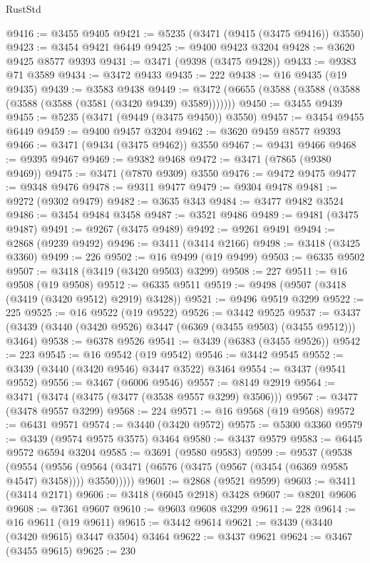 \begin{lexlean}{RustStd}
\begin{coremodule}
{{{{{{{{{{{{{{{{{{{@9416 := @3455 @9405
@9421 := @5235 (@3471 (@9415 (@3475 @9416)) @3550)
@9423 := @3454 @9421 @6449
@9425 := @9400 @9423 @3204
@9428 := @3620 @9425 @8577 @9393
@9431 := @3471 (@9398 (@3475 @9428))
@9433 := @9383 @71 @3589
@9434 := @3472 @9433
@9435 := 222
@9438 := @16 @9435 (@19 @9435)
@9439 := @3583 @9438
@9449 := @3472 (@6655 (@3588 (@3588 (@3588 (@3588 (@3588 (@3581 (@3420 @9439) @3589)))))))
@9450 := @3455 @9439
@9455 := @5235 (@3471 (@9449 (@3475 @9450)) @3550)
@9457 := @3454 @9455 @6449
@9459 := @9400 @9457 @3204
@9462 := @3620 @9459 @8577 @9393
@9466 := @3471 (@9434 (@3475 @9462)) @3550
@9467 := @9431 @9466
@9468 := @9395 @9467
@9469 := @9382 @9468
@9472 := @3471 (@7865 (@9380 @9469))
@9475 := @3471 (@7870 @9309) @3550
@9476 := @9472 @9475
@9477 := @9348 @9476
@9478 := @9311 @9477
@9479 := @9304 @9478
@9481 := @9272 (@9302 @9479)
@9482 := @3635 @343
@9484 := @3477 @9482 @3524
@9486 := @3454 @9484 @3458
@9487 := @3521 @9486
@9489 := @9481 (@3475 @9487)
@9491 := @9267 (@3475 @9489)
@9492 := @9261 @9491
@9494 := @2868 (@9239 @9492)
@9496 := @3411 (@3414 @2166)
@9498 := @3418 (@3425 @3360)
@9499 := 226
@9502 := @16 @9499 (@19 @9499)
@9503 := @6335 @9502
@9507 := @3418 (@3419 (@3420 @9503) @3299)
@9508 := 227
@9511 := @16 @9508 (@19 @9508)
@9512 := @6335 @9511
@9519 := @9498 (@9507 (@3418 (@3419 (@3420 @9512) @2919) @3428))
@9521 := @9496 @9519 @3299
@9522 := 225
@9525 := @16 @9522 (@19 @9522)
@9526 := @3442 @9525
@9537 := @3437 (@3439 (@3440 (@3420 @9526) @3447 (@6369 (@3455 @9503) (@3455 @9512))) @3464)
@9538 := @6378 @9526
@9541 := @3439 (@6383 (@3455 @9526))
@9542 := 223
@9545 := @16 @9542 (@19 @9542)
@9546 := @3442 @9545
@9552 := @3439 (@3440 (@3420 @9546) @3447 @3522) @3464
@9554 := @3437 (@9541 @9552)
@9556 := @3467 (@6006 @9546)
@9557 := @8149 @2919
@9564 := @3471 (@3474 (@3475 (@3477 (@3538 @9557 @3299) @3506)))
@9567 := @3477 (@3478 @9557 @3299)
@9568 := 224
@9571 := @16 @9568 (@19 @9568)
@9572 := @6431 @9571
@9574 := @3440 (@3420 @9572)
@9575 := @5300 @3360
@9579 := @3439 (@9574 @9575 @3575) @3464
@9580 := @3437 @9579
@9583 := @6445 @9572 @6594 @3204
@9585 := @3691 (@9580 @9583)
@9599 := @9537
    (@9538
      (@9554
        (@9556 (@9564 (@3471 (@6576 (@3475 (@9567 (@3454 (@6369 @9585 @4547) @3458)))) @3550)))))
@9601 := @2868 (@9521 @9599)
@9603 := @3411 (@3414 @2171)
@9606 := @3418 (@6045 @2918) @3428
@9607 := @8201 @9606
@9608 := @7361 @9607
@9610 := @9603 @9608 @3299
@9611 := 228
@9614 := @16 @9611 (@19 @9611)
@9615 := @3442 @9614
@9621 := @3439 (@3440 (@3420 @9615) @3447 @3504) @3464
@9622 := @3437 @9621
@9624 := @3467 (@3455 @9615)
@9625 := 230
}}}}}}}}}}}}}}}}}}}
\end{coremodule}
\end{lexlean}
